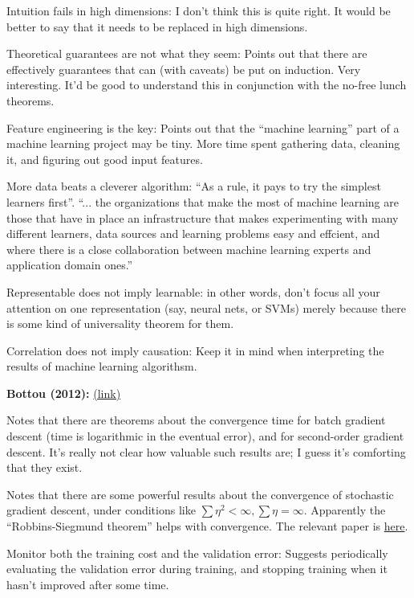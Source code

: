 \documentclass[12pt]{article}
\newcommand{\link}[2]{\href{#1}{#2}}
\begin{document}
Intuition fails in high dimensions: I don't think this is quite right.
It would be better to say that it needs to be replaced in high
dimensions.

Theoretical guarantees are not what they seem: Points out that there
are effectively guarantees that can (with caveats) be put on
induction.  Very interesting.  It'd be good to understand this in
conjunction with the no-free lunch theorems.

Feature engineering is the key: Points out that the ``machine
learning'' part of a machine learning project may be tiny.  More time
spent gathering data, cleaning it, and figuring out good input
features.

More data beats a cleverer algorithm: ``As a rule, it pays to try the
simplest learners first''.  ``... the organizations that make the most
of machine learning are those that have in place an infrastructure
that makes experimenting with many different learners, data sources
and learning problems easy and effcient, and where there is a close
collaboration between machine learning experts and application domain
ones.''

Representable does not imply learnable: in other words, don't focus
all your attention on one representation (say, neural nets, or SVMs)
merely because there is some kind of universality theorem for them.

Correlation does not imply causation: Keep it in mind when
interpreting the results of machine learning algorithsm.

\textbf{Bottou (2012):}
\link{http://leon.bottou.org/papers/bottou-tricks-2012}{(link)}

Notes that there are theorems about the convergence time for batch
gradient descent (time is logarithmic in the eventual error), and for
second-order gradient descent.  It's really not clear how valuable
such results are; I guess it's comforting that they exist.

Notes that there are some powerful results about the convergence of
stochastic gradient descent, under conditions like $\sum \eta^2 <
\infty, \sum \eta = \infty$.  Apparently the ``Robbins-Siegmund
theorem'' helps with convergence.  The relevant paper is
\link{http://scholar.google.ca/scholar?cluster=509989913518206088\&hl=en\&as\_sdt=0,5}{here}.

Monitor both the training cost and the validation error: Suggests
periodically evaluating the validation error during training, and
stopping training when it hasn't improved after some time.
\end{document}
